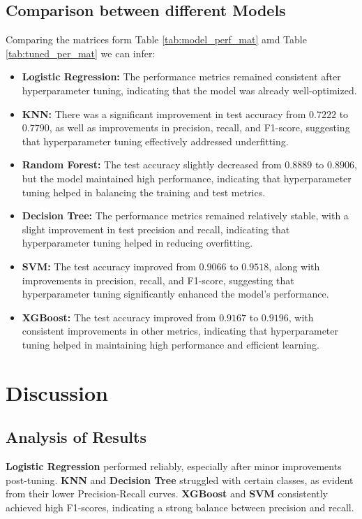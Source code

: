 \documentclass[12pt]{report}
\begin{document}
\section{Comparison between different Models}
Comparing the matrices form Table \ref{tab:model_perf_mat} amd Table \ref{tab:tuned_per_mat} we can infer:
\vspace{-1.5em}
\begin{itemize}
	\setlength\itemsep{-1.5em}
	\item \textbf{Logistic Regression:} The performance metrics remained consistent after hyperparameter tuning, indicating that the model was already well-optimized.
	\item \textbf{KNN:} There was a significant improvement in test accuracy from $0.7222$ to $0.7790$, as well as improvements in precision, recall, and F1-score, suggesting that hyperparameter tuning effectively addressed underfitting.
	\item \textbf{Random Forest:} The test accuracy slightly decreased from $0.8889$ to $0.8906$, but the model maintained high performance, indicating that hyperparameter tuning helped in balancing the training and test metrics.
	\item \textbf{Decision Tree:} The performance metrics remained relatively stable, with a slight improvement in test precision and recall, indicating that hyperparameter tuning helped in reducing overfitting.
	\item \textbf{SVM:} The test accuracy improved from $0.9066$ to $0.9518$, along with improvements in precision, recall, and F1-score, suggesting that hyperparameter tuning significantly enhanced the model's performance.
	\item \textbf{XGBoost:} The test accuracy improved from $0.9167$ to $0.9196$, with consistent improvements in other metrics, indicating that hyperparameter tuning helped in maintaining high performance and efficient learning.
\end{itemize}

\chapter{Discussion}
\section{Analysis of Results}
\textbf{Logistic Regression} performed reliably, especially after minor improvements post-tuning. \textbf{KNN} and \textbf{Decision Tree} struggled with certain classes, as evident from their lower Precision-Recall curves. \textbf{XGBoost} and \textbf{SVM} consistently achieved high F1-scores, indicating a strong balance between precision and recall. 
\end{document}
